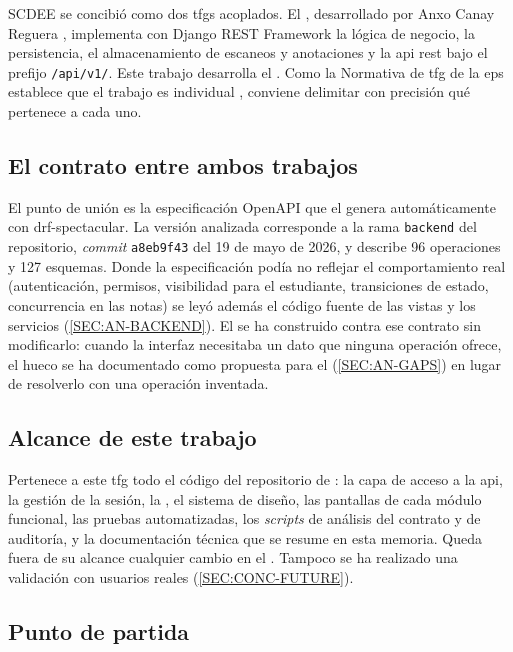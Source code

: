 SCDEE se concibió como dos \acsp{tfg} acoplados. El , desarrollado por Anxo
Canay Reguera \cite{scdee_backend_repo}, implementa con Django REST Framework la lógica de
negocio, la persistencia, el almacenamiento de escaneos y anotaciones y la \acs{api}
\acs{rest} bajo el prefijo \texttt{/api/v1/}. Este trabajo desarrolla el .
Como la Normativa de \acs{tfg} de la \acs{eps} establece que el trabajo es individual
\cite{eps_normativa_tfg_2026}, conviene delimitar con precisión qué pertenece a cada uno.

\subsection*{El contrato entre ambos trabajos}

El punto de unión es la especificación OpenAPI que el  genera automáticamente
con drf-spectacular. La versión analizada corresponde a la rama \texttt{backend} del
repositorio, \textit{commit} \texttt{a8eb9f43} del 19 de mayo de 2026, y describe 96
operaciones y 127 esquemas. Donde la especificación podía no reflejar el comportamiento
real (autenticación, permisos, visibilidad para el estudiante, transiciones de estado,
concurrencia en las notas) se leyó además el código fuente de las vistas y los servicios
(\cref{SEC:AN-BACKEND}). El  se ha construido contra ese contrato sin
modificarlo: cuando la interfaz necesitaba un dato que ninguna operación ofrece, el hueco
se ha documentado como propuesta para el  (\cref{SEC:AN-GAPS}) en lugar de
resolverlo con una operación inventada.

\subsection*{Alcance de este trabajo}

Pertenece a este \acs{tfg} todo el código del repositorio de : la capa de
acceso a la \acs{api}, la gestión de la sesión, la , el sistema de diseño, las
pantallas de cada módulo funcional, las pruebas automatizadas, los \textit{scripts} de
análisis del contrato y de auditoría, y la documentación técnica que se resume en esta
memoria. Queda fuera de su alcance cualquier cambio en el . Tampoco se ha
realizado una validación con usuarios reales (\cref{SEC:CONC-FUTURE}).

\subsection*{Punto de partida}

